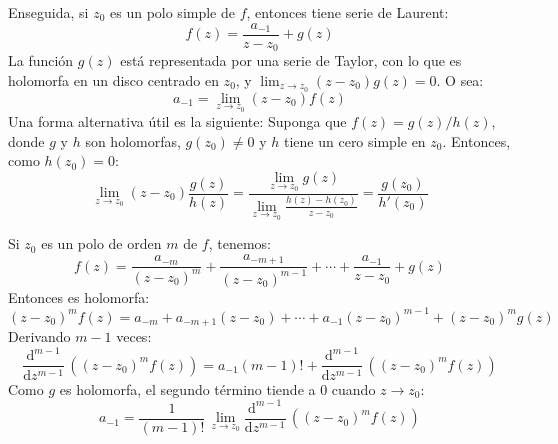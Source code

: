   Enseguida,
  si \(z_0\) es un polo simple de \(f\),
  entonces tiene serie de Laurent:%
  \begin{equation*}
    f(z)
      = \frac{a_{-1}}{z - z_0} + g(z)
  \end{equation*}
  La función \(g(z)\) está representada por una serie de Taylor,
  con lo que es holomorfa en un disco centrado en \(z_0\),
  y \(\lim_{z \rightarrow z_0} (z - z_0) g(z) = 0\).
  O sea:
  \begin{equation*}
    a_{-1}
      = \lim_{z \rightarrow z_0} (z - z_0) f(z)
  \end{equation*}
  Una forma alternativa útil es la siguiente:
  Suponga que \(f(z) = g(z) / h(z)\),
  donde \(g\) y \(h\) son holomorfas,
  \(g(z_0) \ne 0\)
  y \(h\) tiene un cero simple en \(z_0\).
  Entonces,
  como \(h(z_0) = 0\):
  \begin{equation*}
    \lim_{z \rightarrow z_0} (z - z_0) \frac{g(z)}{h(z)}
      = \frac{\lim_{z \rightarrow z_0} g(z)}
	     {\lim_{z \rightarrow z_0} \frac{h(z) - h(z_0)}
					    {z - z_0}}
      = \frac{g(z_0)}{h'(z_0)}
  \end{equation*}

  Si \(z_0\) es un polo de orden \(m\) de \(f\),
  tenemos:
  \begin{equation*}
    f(z)
      = \frac{a_{-m}}{(z - z_0)^m}
	  + \frac{a_{-m + 1}}{(z - z_0)^{m - 1}}
	  + \dotsb
	  + \frac{a_{-1}}{z - z_0}
	  + g(z)
  \end{equation*}
  Entonces es holomorfa:
  \begin{equation*}
    (z - z_0)^m f(z)
      = a_{-m}
	 + a_{- m + 1} (z - z_0)
	 + \dotsb
	 + a_{-1} (z - z_0)^{m - 1}
	 + (z - z_0)^m g(z)
  \end{equation*}
  Derivando \(m - 1\) veces:
  \begin{equation*}
    \frac{\mathrm{d}^{m - 1}}{\mathrm{d} z^{m - 1}} \,
      ((z - z_0)^m f(z))
      = a_{-1} (m - 1)!
	  + \frac{\mathrm{d}^{m - 1}}{\mathrm{d} z^{m - 1}} \,
	      ((z - z_0)^m f(z))
  \end{equation*}
  Como \(g\) es holomorfa,
  el segundo término tiende a 0 cuando \(z \rightarrow z_0\):
  \begin{equation*}
    a_{-1}
      = \frac{1}{(m - 1)!} \,
	  \lim_{z \rightarrow z_0}
	    \frac{\mathrm{d}^{m - 1}}{\mathrm{d} z^{m - 1}} \,
	      ((z - z_0)^m f(z))
  \end{equation*}

